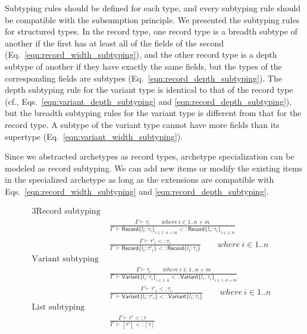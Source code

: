 \documentclass[preprint,3p,onecolumn,times,review]{elsarticle}
\begin{document}
Subtyping rules should be defined for each type, and every subtyping rule should be compatible with the subsumption principle.
We presented the subtyping rules for structured types. In the record type, 
one record type is a breadth subtype of another if the first has at least all of the fields of the second (Eq.~\ref{eqn:record_width_subtyping}), and the other record type is a depth subtype of another if they have exactly the same fields, but the types of the corresponding fields are subtypes (Eq.~\ref{eqn:record_depth_subtyping}).
The depth subtyping rule for the variant type is identical to that of the record type (cf., Eqs.~\ref{eqn:variant_depth_subtyping} and \ref{eqn:record_depth_subtyping}), but the breadth subtyping rules for the variant type is different from that for the record type. A subtype of the variant type cannot have more fields than its supertype (Eq.~\ref{eqn:variant_width_subtyping}).

Since we abstracted archetypes as record types, archetype specialization can be modeled as record subtyping. We can add new items or modify the existing items in the specialized archetype as long as the extensions are compatible with Eqs.~\ref{eqn:record_width_subtyping} and \ref{eqn:record_depth_subtyping}.

\begin{figure}[!htbp]
  \begin{alignat}{3}
    \text{Record subtyping rules:} \qquad   \nonumber\\
    & \frac{\Gamma \vdash \tau_i \qquad where~i \in 1..n+m} 
           {\Gamma ~ \vdash \mathsf{Record}\{l_i : \tau_i\}_{i \in 1..n+m}  <: \mathsf{Record}\{l_i: \tau_i\}_{i \in 1..n}}  & \label{eqn:record_width_subtyping}\\[6pt]
    & \frac{\Gamma \vdash \tau'_i <: \tau_i}
           {\Gamma ~ \vdash \mathsf{Record}\{l_i: \tau'_i \}  <: \mathsf{Record}\{l_i: \tau_i\}}  \qquad where~i \in 1..n & \label{eqn:record_depth_subtyping}\\
    \text{Variant subtyping rules:} \qquad   \nonumber\\
    & \frac{\Gamma \vdash \tau_i \qquad where~i \in 1..n+m} 
           {\Gamma ~ \vdash \mathsf{Variant}\{l_i : \tau_i\}_{i \in 1..n}  <: \mathsf{Variant}\{l_i: \tau_i\}_{i \in 1..n+m}}  & \label{eqn:variant_width_subtyping}\\[6pt]
    & \frac{\Gamma \vdash \tau'_i <: \tau_i}
           {\Gamma ~ \vdash \mathsf{Variant}\{l_i: \tau'_i \}  <: \mathsf{Variant}\{l_i: \tau_i\}}  \qquad where~i \in 1..n & \label{eqn:variant_depth_subtyping}\\
    \text{List subtyping rule:} \qquad   \nonumber\\
    & \frac{\Gamma \vdash \tau' <: \tau}
           {\Gamma ~ \vdash [\tau'] <: [\tau]}                                                    & \label{eqn:list_subtyping_rule}
  \end{alignat}
\end{figure}
\end{document}
